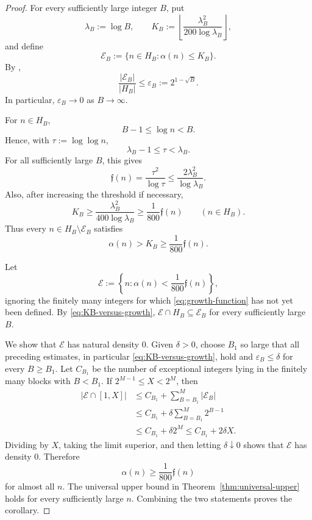 \documentclass[11pt]{article}
\theoremstyle{definition}
\theoremstyle{remark}
\newcommand{\growth}[1]{\mathfrak f(#1)}
\begin{document}
\begin{proof}
For every sufficiently large integer $B$, put
\[
  \lambda_B:=\log B,
  \qquad
  K_B:=\left\lfloor\frac{\lambda_B^2}{200\log \lambda_B}\right\rfloor,
\]
and define
\[
  \mathcal E_B:=\{n\in H_B:\alpha(n)\le K_B\}.
\]
By ,
\begin{equation}
  \frac{|\mathcal E_B|}{|H_B|}
  \le\varepsilon_B:=2^{1-\sqrt B}.
  \label{eq:block-exceptional-proportion}
\end{equation}
In particular, $\varepsilon_B\to0$ as $B\to\infty$.

For $n\in H_B$,
\[
  B-1\le\log n<B.
\]
Hence, with $\tau:=\log\log n$,
\begin{equation}
  \lambda_B-1\le \tau<\lambda_B.
  \label{eq:block-loglog-comparison}
\end{equation}
For all sufficiently large $B$, this gives
\[
  \growth{n}=\frac{\tau^2}{\log \tau}
  \le\frac{2\lambda_B^2}{\log \lambda_B}.
\]
Also, after increasing the threshold if necessary,
\begin{equation}
  K_B\ge\frac{\lambda_B^2}{400\log \lambda_B}
  \ge\frac1{800}\growth{n}
  \qquad(n\in H_B).
  \label{eq:KB-versus-growth}
\end{equation}
Thus every $n\in H_B\setminus \mathcal E_B$ satisfies
\[
  \alpha(n)>K_B\ge\frac1{800}\growth{n}.
\]

Let
\[
  \mathcal E:=\left\{n:\alpha(n)<\frac1{800}\growth{n}\right\},
\]
ignoring the finitely many integers for which \eqref{eq:growth-function} has
not yet been defined. By \eqref{eq:KB-versus-growth},
$\mathcal E\cap H_B\subseteq \mathcal E_B$ for every sufficiently large $B$.

We show that $\mathcal E$ has natural density $0$. Given $\delta>0$, choose $B_1$ so
large that all preceding estimates, in particular
\eqref{eq:KB-versus-growth}, hold and $\varepsilon_B\le\delta$ for every
$B\ge B_1$. Let $C_{B_1}$ be
the number of exceptional integers lying in the finitely many blocks with
$B<B_1$. If $2^{M-1}\le X<2^M$, then
\begin{align*}
  |\mathcal E\cap[1,X]|
  &\le C_{B_1}+\sum_{B=B_1}^{M}|\mathcal E_B|\\
  &\le C_{B_1}+\delta\sum_{B=B_1}^{M}2^{B-1}\\
  &\le C_{B_1}+\delta 2^M
  \le C_{B_1}+2\delta X.
\end{align*}
Dividing by $X$, taking the limit superior, and then letting $\delta\downarrow0$
shows that $\mathcal E$ has density $0$. Therefore
\[
  \alpha(n)\ge\frac1{800}\growth{n}
\]
for almost all $n$. The universal upper bound in Theorem~\ref{thm:universal-upper}
holds for every sufficiently large $n$. Combining the two statements proves the corollary.
\end{proof}
\end{document}

